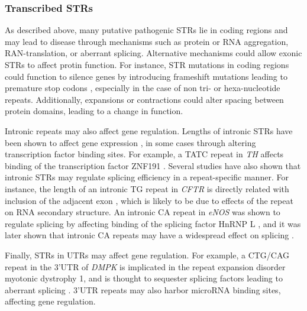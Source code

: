 \subsubsection{Transcribed STRs}
As described above, many putative pathogenic STRs lie in coding regions and may lead to disease through mechanisms such as protein or RNA aggregation, RAN-translation, or aberrant splicing. Alternative mechanisms could allow exonic STRs to affect protin function. For instance, STR mutations in coding regions could function to silence genes by introducing frameshift mutations leading to premature stop codons \cite{GemayelVincesLegendreEtAl2010}, especially in the case of non tri- or hexa-nucleotide repeats. Additionally, expansions or contractions could alter spacing between protein domains, leading to a change in function.

Intronic repeats may also affect gene regulation. Lengths of intronic STRs have been shown to affect gene expression \cite{GebhardtZankerBrandt1999}, in some cases through altering transcription factor binding sites. For example, a TATC repeat in \emph{TH} affects binding of the transcription factor ZNF191 \cite{AlbaneseBiguetKieferEtAl2001}. Several studies have also shown that intronic STRs may regulate splicing efficiency in a repeat-specific manner. For instance, the length of an intronic TG repeat in \emph{CFTR} is directly related with inclusion of the adjacent exon \cite{HefferonGromanYurkEtAl2004}, which is likely to be due to effects of the repeat on RNA secondary structure. An intronic CA repeat in \emph{eNOS} was shown to regulate splicing by affecting binding of the splicing factor HnRNP L \cite{HuiStanglLaneEtAl2003}, and it was later shown that intronic CA repeats may have a widespread effect on splicing \cite{HuiHungHeinerEtAl2005}.

Finally, STRs in UTRs may affect gene regulation. For example, a CTG/CAG repeat in the 3'UTR of \emph{DMPK} is implicated in the repeat expansion disorder myotonic dystrophy 1, and is thought to sequester splicing factors leading to aberrant splicing \cite{KoscianskaWitkosKozlowskaEtAl2015}. 3'UTR repeats may also harbor microRNA binding sites, affecting gene regulation.

